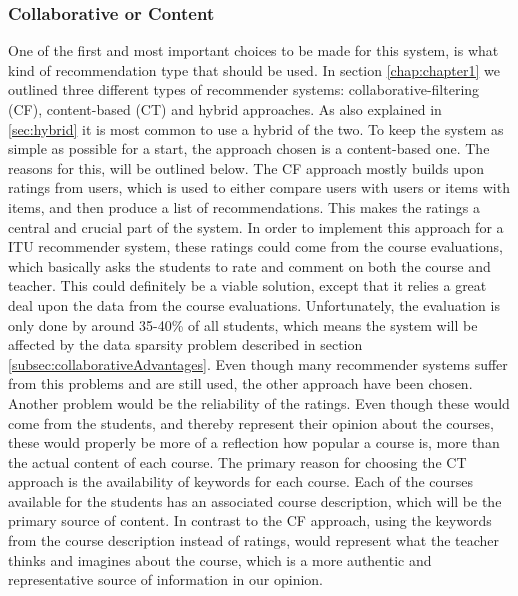 \subsubsection*{Collaborative or Content}
One of the first and most important choices to be made for this system, is what kind of recommendation type that should be used. In section \ref{chap:chapter1} we outlined three different types of recommender systems: collaborative-filtering (CF), content-based (CT) and hybrid approaches. As also explained in \ref{sec:hybrid} it is most common to use a hybrid of the two. To keep the system as simple as possible for a start, the approach chosen is a content-based one. The reasons for this, will be outlined below. \newline
The CF approach mostly builds upon ratings from users, which is used to either compare users with users or items with items, and then produce a list of recommendations. This makes the ratings a central and crucial part of the system. In order to implement this approach for a ITU recommender system, these ratings could come from the course evaluations, which basically asks the students to rate and comment on both the course and teacher. This could definitely be a viable solution, except that it relies a great deal upon the data from the course evaluations. Unfortunately, the evaluation is only done by around 35-40\% of all students, which means the system will be affected by the data sparsity problem described in section \ref{subsec:collaborativeAdvantages}. Even though many recommender systems suffer from this problems and are still used, the other approach have been chosen.\newline 
Another problem would be the reliability of the ratings. Even though these would come from the students, and thereby represent their opinion about the courses, these would properly be more of a reflection how popular a course is, more than the actual content of each course.\newline 
The primary reason for choosing the CT approach is the availability of keywords for each course. Each of the courses available for the students has an associated course description, which will be the primary source of content. In contrast to the CF approach, using the keywords from the course description instead of ratings, would represent what the teacher thinks and imagines about the course, which is a more authentic and representative source of information in our opinion. 


